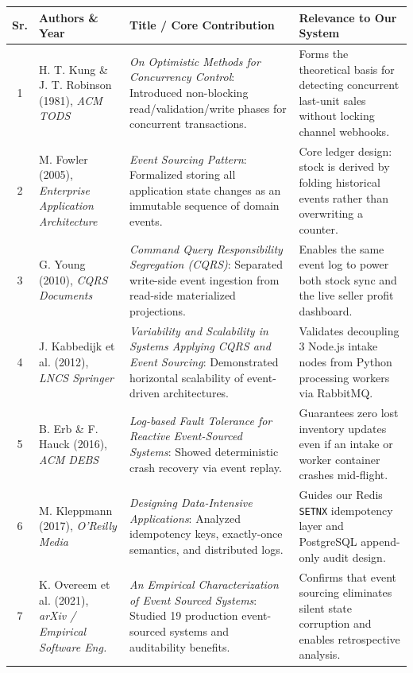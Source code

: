 \documentclass[oneside,a4paper,12pt]{report}
\begin{document}
\begin{table}[!htbp]
\centering
\footnotesize
\renewcommand{\arraystretch}{1.35}
\begin{tabularx}{\textwidth}{|c|p{3.4cm}|X|p{3.6cm}|}
\hline
\textbf{Sr.} & \textbf{Authors \& Year} & \textbf{Title / Core Contribution} & \textbf{Relevance to Our System} \\ \hline
1 & H. T. Kung \& J. T. Robinson (1981), \textit{ACM TODS} \cite{kung1981} & \textit{On Optimistic Methods for Concurrency Control}: Introduced non-blocking read/validation/write phases for concurrent transactions. & Forms the theoretical basis for detecting concurrent last-unit sales without locking channel webhooks. \\ \hline
2 & M. Fowler (2005), \textit{ Enterprise Application Architecture} \cite{fowler2005} & \textit{Event Sourcing Pattern}: Formalized storing all application state changes as an immutable sequence of domain events. & Core ledger design: stock is derived by folding historical events rather than overwriting a counter. \\ \hline
3 & G. Young (2010), \textit{CQRS Documents} \cite{young2010} & \textit{Command Query Responsibility Segregation (CQRS)}: Separated write-side event ingestion from read-side materialized projections. & Enables the same event log to power both stock sync and the live seller profit dashboard. \\ \hline
4 & J. Kabbedijk et al. (2012), \textit{LNCS Springer} \cite{kabbedijk2012} & \textit{Variability and Scalability in Systems Applying CQRS and Event Sourcing}: Demonstrated horizontal scalability of event-driven architectures. & Validates decoupling 3 Node.js intake nodes from Python processing workers via RabbitMQ. \\ \hline
5 & B. Erb \& F. Hauck (2016), \textit{ACM DEBS} \cite{erb2016} & \textit{Log-based Fault Tolerance for Reactive Event-Sourced Systems}: Showed deterministic crash recovery via event replay. & Guarantees zero lost inventory updates even if an intake or worker container crashes mid-flight. \\ \hline
6 & M. Kleppmann (2017), \textit{O'Reilly Media} \cite{kleppmann2017} & \textit{Designing Data-Intensive Applications}: Analyzed idempotency keys, exactly-once semantics, and distributed logs. & Guides our Redis \texttt{SETNX} idempotency layer and PostgreSQL append-only audit design. \\ \hline
7 & K. Overeem et al. (2021), \textit{arXiv / Empirical Software Eng.} \cite{overeem2021} & \textit{An Empirical Characterization of Event Sourced Systems}: Studied 19 production event-sourced systems and auditability benefits. & Confirms that event sourcing eliminates silent state corruption and enables retrospective analysis. \\ \hline

\end{tabularx}
\end{table}
\end{document}
